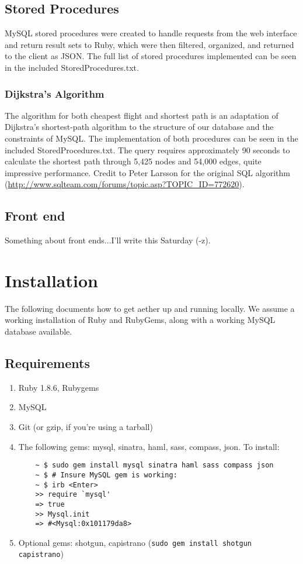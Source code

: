 \subsection{Stored Procedures}
MySQL stored procedures were created to handle requests from the web interface and return result sets to Ruby, which were then filtered, organized, and returned to the client as JSON. The full list of stored procedures implemented can be seen in the included StoredProcedures.txt.

\subsubsection{Dijkstra's Algorithm}
The algorithm for both cheapest flight and shortest path is an adaptation of Dijkstra's shortest-path algorithm to the structure of our database and the constraints of MySQL. The implementation of both procedures can be seen in the included StoredProcedures.txt.  The query requires approximately 90 seconds to calculate the shortest path through 5,425 nodes and 54,000 edges, quite impressive performance. Credit to Peter Larsson for the original SQL algorithm (\mbox{\url{http://www.sqlteam.com/forums/topic.asp?TOPIC_ID=772620}}).

\subsection{Front end}
Something about front ends...I'll write this Saturday (-z).

\section{Installation}
The following documents how to get aether up and running locally. We assume a working installation of Ruby and RubyGems, along with a working MySQL database available.
\subsection{Requirements}
\begin{enumerate}
  \item Ruby 1.8.6, Rubygems
  \item MySQL
  \item Git (or gzip, if you're using a tarball)
  \item The following gems: mysql, sinatra, haml, sass, compass, json. To install:
  \begin{verbatim}
    ~ $ sudo gem install mysql sinatra haml sass compass json
    ~ $ # Insure MySQL gem is working:
    ~ $ irb <Enter>
    >> require `mysql'
    => true
    >> Mysql.init
    => #<Mysql:0x101179da8>
  \end{verbatim}
  \item Optional gems: shotgun, capistrano (\verb!sudo gem install shotgun capistrano!)
\end{enumerate}
